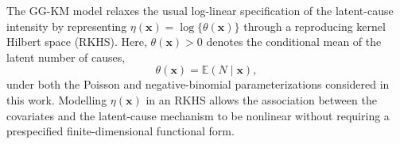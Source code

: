 {

	The GG-KM model relaxes the usual log-linear specification of the latent-cause
	intensity by representing
	$
	    \eta(\bm{x})
	    =
	    \log\{\theta(\bm{x})\}
	$
	through a reproducing kernel Hilbert space (RKHS). Here,
	$\theta(\bm{x})>0$ denotes the conditional mean of the latent number of causes,
	\begin{equation}
	    \theta(\bm{x})
	    =
	    \mathbb{E}(N\mid\bm{x}),
	\end{equation}
	under both the Poisson and negative-binomial parameterizations considered in
	this work. Modelling $\eta(\bm{x})$ in an RKHS allows the association between
	the covariates and the latent-cause mechanism to be nonlinear without requiring
	a prespecified finite-dimensional functional form.


}
